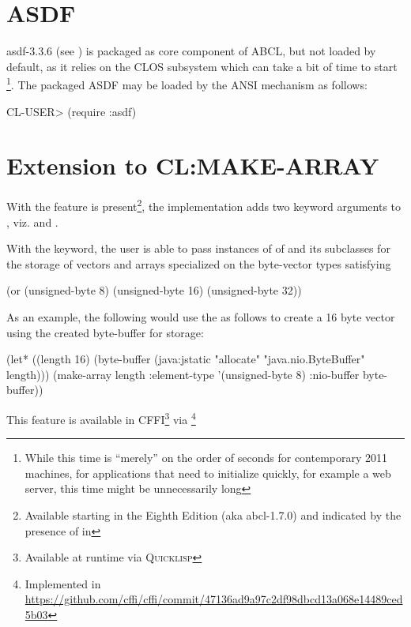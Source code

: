 \documentclass[10pt]{book}
\begin{document}
\section{ASDF}

asdf-3.3.6 (see \cite{asdf}) is packaged as core component of
\textsc{ABCL}, but not loaded by default, as it relies on the
\textsc{CLOS} subsystem which can take a bit of time to
start \footnote{While this time is ``merely'' on the order of seconds
for contemporary 2011 machines, for applications that need to
initialize quickly, for example a web server, this time might be
unnecessarily long}.  The packaged \textsc{ASDF} may be loaded by the
\textsc{ANSI}  mechanism as follows:

\begin{listing-lisp}
CL-USER> (require :asdf)
\end{listing-lisp}

\section{Extension to CL:MAKE-ARRAY}
\label{section:make-array}

With the  feature is present\footnote{Available starting in
the Eighth Edition (aka abcl-1.7.0) and indicated by the presence of
 in }, the implementation adds two
keyword arguments to , viz.  and
.

With the  keyword, the user is able to pass
instances of of  and its subclasses for the
storage of vectors and arrays specialized on the byte-vector
types satisfying

\begin{listing-lisp}
  (or
    (unsigned-byte 8)
    (unsigned-byte 16)
    (unsigned-byte 32))
\end{listing-lisp}

As an example, the following would use the  as
follows to create a 16 byte vector using the created byte-buffer for
storage:

\begin{listing-lisp}
  (let* ((length 16)
         (byte-buffer (java:jstatic "allocate" "java.nio.ByteBuffer" length)))
    (make-array length :element-type '(unsigned-byte 8) :nio-buffer byte-buffer))
\end{listing-lisp}

This feature is available in CFFI\footnote{Available at runtime via
\textsc{Quicklisp}} via
\footnote{Implemented in
\url{https://github.com/cffi/cffi/commit/47136ad9a97c2df98dbcd13a068e14489ced5b03}}
\end{document}
